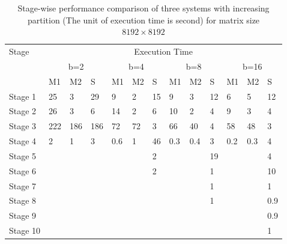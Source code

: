 \begin{table}[h!]
	\caption{Stage-wise performance comparison of three systems with increasing partition (The unit of execution time is second) for matrix size $8192\times 8192$}
	\label{tab:Stagewise-8192}
	\begin{minipage}{\columnwidth}
		\begin{center}
			\begin{tabular}{lllllllllllll}
				\toprule
				Stage & \multicolumn{12}{c}{Execution Time} \\
				& \multicolumn{3}{c}{b=2} & \multicolumn{3}{c}{b=4} & \multicolumn{3}{c}{b=8} & \multicolumn{3}{c}{b=16} \\
				& M1 & M2 & S & M1 & M2 & S & M1 & M2 & S & M1 & M2 & S \\	
				\toprule			
				Stage 1 & \cellcolor{green}25 & \cellcolor{green}3 & 29 & \cellcolor{green}9 & \cellcolor{green}2 & 15 & \cellcolor{green}9 & \cellcolor{green}3 & 12 & \cellcolor{green}6 & \cellcolor{green}5 & 12 \\				
				\toprule				
				Stage 2 & \cellcolor{green}26 & \cellcolor{green}3 & \cellcolor{green}6 & \cellcolor{green}14 & \cellcolor{green}2 & \cellcolor{green}6 & \cellcolor{green}10 & \cellcolor{green}2 & \cellcolor{green}4 & \cellcolor{green}9 & \cellcolor{green}3 & \cellcolor{green}4 \\
				\toprule
				Stage 3 & \cellcolor{red}222 & \cellcolor{red}186 & \cellcolor{red}186 & \cellcolor{red}72 & \cellcolor{red}72 & \cellcolor{green}3 & \cellcolor{red}66 & \cellcolor{red}40 & \cellcolor{green}4 & \cellcolor{red}58 & \cellcolor{red}48 & \cellcolor{green}3 \\
				\toprule
				Stage 4 & \cellcolor{green}2 & \cellcolor{green}1 & \cellcolor{green}3 & \cellcolor{green}0.6 & \cellcolor{green}1 & \cellcolor{red}46 & \cellcolor{green}0.3 & \cellcolor{green}0.4 & \cellcolor{green}3 & \cellcolor{green}0.2 & \cellcolor{green}0.3 & \cellcolor{green}4 \\
				\toprule
				Stage 5 & & & & & & \cellcolor{green}2 & & & \cellcolor{red}19 & & & \cellcolor{green}4 \\
				\toprule			
				Stage 6 & & & & & & \cellcolor{green}2 & & & \cellcolor{green}1 & & & \cellcolor{red}10 \\
				\toprule
				Stage 7 & & & & & & & & & \cellcolor{green}1 & & & \cellcolor{green}1 \\
				\toprule
				Stage 8 & & & & & & & & & \cellcolor{green}1 & & & \cellcolor{green}0.9 \\
				\toprule
				Stage 9 & & & & & & & & & & & & \cellcolor{green}0.9 \\
				\toprule
				Stage 10 & & & & & & & & & & & & \cellcolor{green}1 \\
				\bottomrule
			\end{tabular}
		\end{center}
	\end{minipage}
\end{table}

